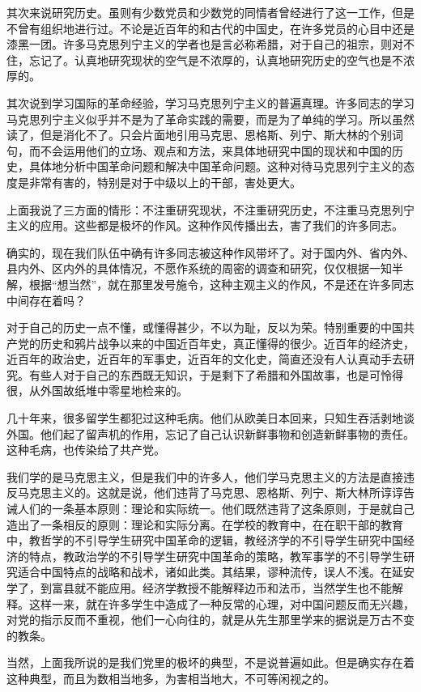 其次来说研究历史。虽则有少数党员和少数党的同情者曾经进行了这一工作，但是不曾有组织地进行过。不论是近百年的和古代的中国史，在许多党员的心目中还是漆黑一团。许多马克思列宁主义的学者也是言必称希腊，对于自己的祖宗，则对不住，忘记了。认真地研究现状的空气是不浓厚的，认真地研究历史的空气也是不浓厚的。

其次说到学习国际的革命经验，学习马克思列宁主义的普遍真理。许多同志的学习马克思列宁主义似乎并不是为了革命实践的需要，而是为了单纯的学习。所以虽然读了，但是消化不了。只会片面地引用马克思、恩格斯、列宁、斯大林的个别词句，而不会运用他们的立场、观点和方法，来具体地研究中国的现状和中国的历史，具体地分析中国革命问题和解决中国革命问题。这种对待马克思列宁主义的态度是非常有害的，特别是对于中级以上的干部，害处更大。

上面我说了三方面的情形：不注重研究现状，不注重研究历史，不注重马克思列宁主义的应用。这些都是极坏的作风。这种作风传播出去，害了我们的许多同志。

确实的，现在我们队伍中确有许多同志被这种作风带坏了。对于国内外、省内外、县内外、区内外的具体情况，不愿作系统的周密的调查和研究，仅仅根据一知半解，根据“想当然”，就在那里发号施令，这种主观主义的作风，不是还在许多同志中间存在着吗？

对于自己的历史一点不懂，或懂得甚少，不以为耻，反以为荣。特别重要的中国共产党的历史和鸦片战争以来的中国近百年史，真正懂得的很少。近百年的经济史，近百年的政治史，近百年的军事史，近百年的文化史，简直还没有人认真动手去研究。有些人对于自己的东西既无知识，于是剩下了希腊和外国故事，也是可怜得很，从外国故纸堆中零星地检来的。

几十年来，很多留学生都犯过这种毛病。他们从欧美日本回来，只知生吞活剥地谈外国。他们起了留声机的作用，忘记了自己认识新鲜事物和创造新鲜事物的责任。这种毛病，也传染给了共产党。

我们学的是马克思主义，但是我们中的许多人，他们学马克思主义的方法是直接违反马克思主义的。这就是说，他们违背了马克思、恩格斯、列宁、斯大林所谆谆告诫人们的一条基本原则：理论和实际统一。他们既然违背了这条原则，于是就自己造出了一条相反的原则：理论和实际分离。在学校的教育中，在在职干部的教育中，教哲学的不引导学生研究中国革命的逻辑，教经济学的不引导学生研究中国经济的特点，教政治学的不引导学生研究中国革命的策略，教军事学的不引导学生研究适合中国特点的战略和战术，诸如此类。其结果，谬种流传，误人不浅。在延安学了，到富县就不能应用。经济学教授不能解释边币和法币，当然学生也不能解释。这样一来，就在许多学生中造成了一种反常的心理，对中国问题反而无兴趣，对党的指示反而不重视，他们一心向往的，就是从先生那里学来的据说是万古不变的教条。

当然，上面我所说的是我们党里的极坏的典型，不是说普遍如此。但是确实存在着这种典型，而且为数相当地多，为害相当地大，不可等闲视之的。

